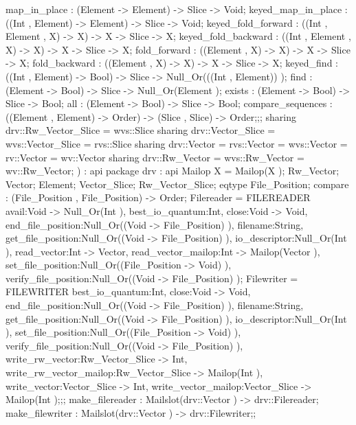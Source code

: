 {{                map_in_place : (Element -> Element) -> Slice -> Void;
                keyed_map_in_place : ((Int , Element) -> Element) -> Slice -> Void;
                keyed_fold_forward : ((Int , Element , X) -> X) -> X -> Slice -> X;
                keyed_fold_backward : ((Int , Element , X) -> X) -> X -> Slice -> X;
                fold_forward : ((Element , X) -> X) -> X -> Slice -> X;
                fold_backward : ((Element , X) -> X) -> X -> Slice -> X;
                keyed_find : ((Int , Element) -> Bool) -> Slice -> Null_Or(((Int , Element)) );
                find : (Element -> Bool) -> Slice -> Null_Or(Element );
                exists : (Element -> Bool) -> Slice -> Bool;
                all : (Element -> Bool) -> Slice -> Bool;
                compare_sequences : ((Element , Element) -> Order) -> (Slice , Slice) -> Order;};;
    sharing drv::Rw_Vector_Slice = wvs::Slice
    sharing drv::Vector_Slice = wvs::Vector_Slice = rvs::Slice
    sharing drv::Vector = rvs::Vector = wvs::Vector = rv::Vector = wv::Vector
    sharing drv::Rw_Vector = wvs::Rw_Vector = wv::Rw_Vector};
)
:
api {   package drv
          : api {
                Mailop X = Mailop(X );
                Rw_Vector;
                Vector;
                Element;
                Vector_Slice;
                Rw_Vector_Slice;
                eqtype File_Position;
                compare : (File_Position , File_Position) -> Order;
                    Filereader
                    = FILEREADER        {avail:Void -> Null_Or(Int ), best_io_quantum:Int, close:Void -> Void,
                                        end_file_position:Null_Or((Void -> File_Position) ), filename:String,
                                        get_file_position:Null_Or((Void -> File_Position) ), io_descriptor:Null_Or(Int ),
                                        read_vector:Int -> Vector, read_vector_mailop:Int -> Mailop(Vector ),
                                        set_file_position:Null_Or((File_Position -> Void) ),
                                        verify_file_position:Null_Or((Void -> File_Position) )};
                    Filewriter
                    = FILEWRITER
                            {best_io_quantum:Int, close:Void -> Void, end_file_position:Null_Or((Void -> File_Position) ),
                            filename:String, get_file_position:Null_Or((Void -> File_Position) ), io_descriptor:Null_Or(Int ),
                            set_file_position:Null_Or((File_Position -> Void) ),
                            verify_file_position:Null_Or((Void -> File_Position) ), write_rw_vector:Rw_Vector_Slice -> Int,
                            write_rw_vector_mailop:Rw_Vector_Slice -> Mailop(Int ), write_vector:Vector_Slice -> Int,
                            write_vector_mailop:Vector_Slice -> Mailop(Int )};};;
    make_filereader : Mailslot(drv::Vector ) -> drv::Filereader;
    make_filewriter : Mailslot(drv::Vector ) -> drv::Filewriter;};
